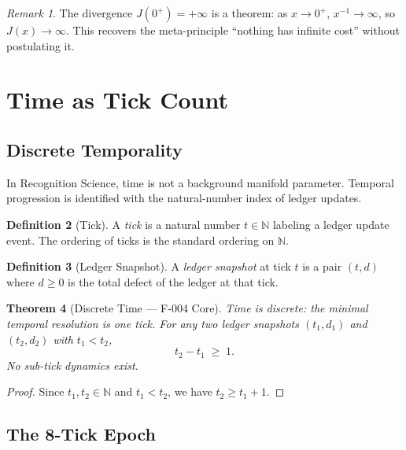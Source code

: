 \documentclass[12pt,a4paper]{article}
\newtheorem{theorem}{Theorem}[section]
\theoremstyle{definition}
\newtheorem{definition}[theorem]{Definition}
\theoremstyle{remark}
\newtheorem{remark}[theorem]{Remark}
\begin{document}
\begin{remark}
The divergence $J(0^+) = +\infty$ is a theorem: as $x \to 0^+$,
$x^{-1} \to \infty$, so $J(x) \to \infty$.  This recovers the
meta-principle ``nothing has infinite cost'' without postulating it.
\end{remark}

\section{Time as Tick Count}
\label{sec:time}

\subsection{Discrete Temporality}

In Recognition Science, time is not a background manifold parameter.
Temporal progression is identified with the natural-number index of ledger
updates.

\begin{definition}[Tick]
\label{def:tick}
A \emph{tick} is a natural number $t \in \mathbb{N}$ labeling a ledger
update event.  The ordering of ticks is the standard ordering on
$\mathbb{N}$.
\end{definition}

\begin{definition}[Ledger Snapshot]
\label{def:snapshot}
A \emph{ledger snapshot} at tick $t$ is a pair $(t, d)$ where $d \geq 0$
is the total defect of the ledger at that tick.
\end{definition}

\begin{theorem}[Discrete Time --- F-004 Core]
\label{thm:discrete-time}
Time is discrete: the minimal temporal resolution is one tick.  For any two
ledger snapshots $(t_1, d_1)$ and $(t_2, d_2)$ with $t_1 < t_2$,
\[
  t_2 - t_1 \;\geq\; 1.
\]
No sub-tick dynamics exist.
\end{theorem}

\begin{proof}
Since $t_1, t_2 \in \mathbb{N}$ and $t_1 < t_2$, we have $t_2 \geq t_1 + 1$.
\end{proof}

\subsection{The 8-Tick Epoch}
\end{document}
